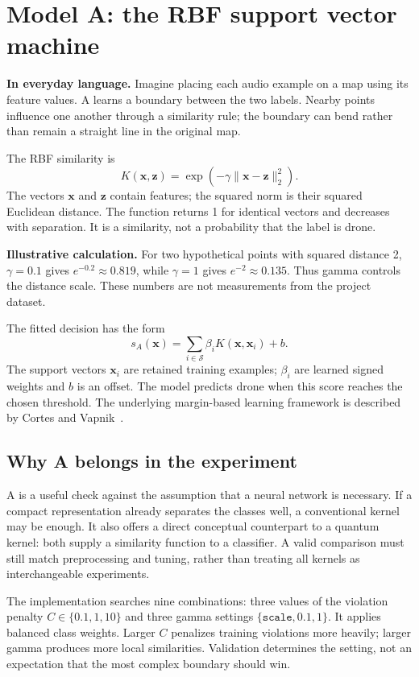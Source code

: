 \documentclass[11pt,letterpaper]{article}
\newcommand{\plain}[1]{\par\smallskip\noindent\textbf{In everyday language.} #1\par\smallskip}
\begin{document}
\section{Model A: the RBF support vector machine}
\label{sec:modela}
\plain{Imagine placing each audio example on a map using its feature values.
A learns a boundary between the two labels. Nearby points influence one
another through a similarity rule; the boundary can bend rather than remain
a straight line in the original map.}

The RBF similarity is
\begin{equation}
 K(\mathbf{x},\mathbf{z})=\exp(-\gamma\|\mathbf{x}-\mathbf{z}\|_2^2).
\end{equation}
The vectors $\mathbf{x}$ and $\mathbf{z}$ contain features; the squared norm
is their squared Euclidean distance. The function returns 1 for identical
vectors and decreases with separation. It is a similarity, not a probability
that the label is drone.

\textbf{Illustrative calculation.} For two hypothetical points with squared
distance 2, $\gamma=0.1$ gives $e^{-0.2}\approx0.819$, while $\gamma=1$
gives $e^{-2}\approx0.135$. Thus gamma controls the distance scale. These
numbers are not measurements from the project dataset.

The fitted decision has the form
\begin{equation}
 s_A(\mathbf{x})=\sum_{i\in\mathcal{S}}\beta_iK(\mathbf{x},\mathbf{x}_i)+b.
\end{equation}
The support vectors $\mathbf{x}_i$ are retained training examples;
$\beta_i$ are learned signed weights and $b$ is an offset. The model predicts
drone when this score reaches the chosen threshold. The underlying margin-based
learning framework is described by Cortes and Vapnik~\cite{svmoriginal}.

\subsection{Why A belongs in the experiment}
A is a useful check against the assumption that a neural network is necessary.
If a compact representation already separates the classes well, a conventional
kernel may be enough. It also offers a direct conceptual counterpart to a
quantum kernel: both supply a similarity function to a classifier. A valid
comparison must still match preprocessing and tuning, rather than treating
all kernels as interchangeable experiments.

The implementation searches nine combinations: three values of the violation
penalty $C\in\{0.1,1,10\}$ and three gamma settings
$\{\texttt{scale},0.1,1\}$. It applies balanced class weights. Larger $C$
penalizes training violations more heavily; larger gamma produces more local
similarities. Validation determines the setting, not an expectation that the
most complex boundary should win.
\end{document}

